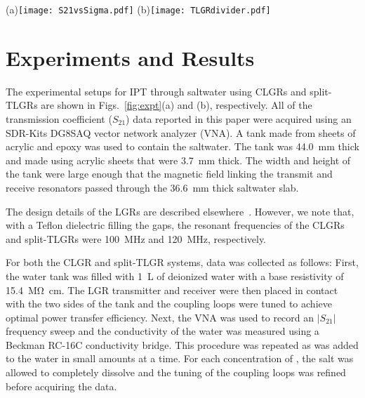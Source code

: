 \documentclass[conference]{IEEEtran}
\begin{document}
\begin{figure*}[t]
\centerline{
(a)\texttt{[image: S21vsSigma.pdf]} \qquad (b)\texttt{[image: TLGRdivider.pdf]}
}
\caption{Peak $\left\vert S_{21}\right\vert$ as a function of conductivity.  The horizontal dashed lines are placed at \SI{-3}{\decibel}.  The vertical dotted lines indicate the critical conductivity of the various systems investigated.  (a) CLGR IPT with the system resonant frequency tuned to three different values. The critical conductivity decreases with increasing frequency.  (b) TLGR IPT with and without dividers used to suppress induced current loops in the saltwater.  The solid line is a fit to the circuit model shown in Fig.~\ref{fig:circuit}.}
\label{fig:peakS21}
\end{figure*}


\section{Experiments and Results}\label{sec:expt}
The experimental setups for IPT through saltwater using CLGRs and split-TLGRs are shown in Figs.~\ref{fig:expt}(a) and (b), respectively.  All of the transmission coefficient ($S_{21}$) data reported in this paper were acquired using an SDR-Kits DG8SAQ vector network analyzer (VNA). A tank made from sheets of acrylic and epoxy was used to contain the saltwater.  The tank was \SI{44.0}{\milli\meter} thick and made using acrylic sheets that were \SI{3.7}{\milli\meter} thick.  The width and height of the tank were large enough that the magnetic field linking the transmit and receive resonators passed through the \SI[number-unit-product={\text{-}}]{36.6}{\milli\meter} thick saltwater slab. 

The design details of the LGRs are described elsewhere~\cite{Roberts:2020}.  However, we note that, with a Teflon dielectric filling the gaps, the resonant frequencies of the CLGRs and split-TLGRs were \SI{100}{\mega\hertz} and \SI{120}{\mega\hertz}, respectively. 

For both the CLGR and split-TLGR systems, data was collected as follows: First, the water tank was filled with \SI{1}{L} of deionized water with a base resistivity of \SI{15.4}{\mega\ohm\centi\meter}.  The LGR transmitter and receiver were then placed in contact with the two sides of the tank and the coupling loops were tuned to achieve optimal power transfer efficiency.  Next, the VNA was used to record an $\left\vert S_{21}\right\vert$ frequency sweep and the conductivity of the water was measured using a Beckman RC-16C conductivity bridge.  This procedure was repeated as  was added to the water in small amounts at a time.  For each concentration of , the salt was allowed to completely dissolve and the tuning of the coupling loops was refined before acquiring the data.  
\end{document}
